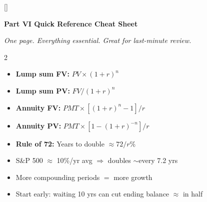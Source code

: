 \documentclass[11pt, letterpaper]{article}
\newcommand{\purplesections}{%
  \titleformat{\section}{\large\bfseries\color{sectionpurple}}{}{0em}{}[\color{sectionpurple}\titlerule]%
  \titleformat{\subsection}{\normalsize\bfseries\color{sectionpurple!80!black}}{}{0em}{}%
}
\newcommand{\partbanner}[3]{%
  \begin{tcolorbox}[colback=#1, colframe=#2, boxrule=1.2pt, arc=4pt,
    left=8pt, right=8pt, top=6pt, bottom=6pt]
    \begin{center}{\LARGE\bfseries #3}\end{center}
  \end{tcolorbox}%
}
\begin{document}
\newpage

\purplesections
{}
\partbanner{part3bg}{sectionpurple}{Part VI \quad Quick Reference Cheat Sheet}

\vspace{4pt}
\begin{center}\small\itshape One page. Everything essential. Great for last-minute review.\end{center}
\vspace{4pt}

\begin{tcolorbox}[colback=part2bg, colframe=sectiongreen,
  title={\bfseries Time Value of Money \& Compounding}, arc=3pt, boxrule=1pt]
\footnotesize
\begin{multicols}{2}
\begin{itemize}[noitemsep, leftmargin=*]
  \item \textbf{Lump sum FV:} $PV \times (1+r)^n$
  \item \textbf{Lump sum PV:} $FV / (1+r)^n$
  \item \textbf{Annuity FV:} $PMT \times [(1+r)^n - 1] / r$
  \item \textbf{Annuity PV:} $PMT \times [1 - (1+r)^{-n}] / r$
\end{itemize}
\columnbreak
\begin{itemize}[noitemsep, leftmargin=*]
  \item \textbf{Rule of 72:} Years to double $\approx 72 / r\%$
  \item S\&P 500 $\approx$ 10\%/yr avg $\Rightarrow$ doubles $\sim$every 7.2 yrs
  \item More compounding periods $=$ more growth
  \item Start early: waiting 10 yrs can cut ending balance $\approx$ in half
\end{itemize}
\end{multicols}
\end{tcolorbox}

\vspace{4pt}
\end{document}
